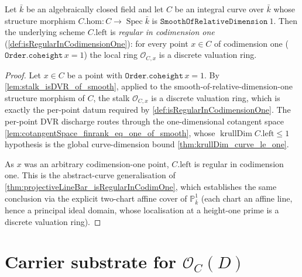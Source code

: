 \begin{theorem}

  \label{thm:smooth_isRegularInCodimOne}
  Let \(\bar k\) be an algebraically closed field and let \(C\) be an
  integral curve over
  \(\bar k\) whose structure morphism
  \(C.\mathrm{hom} : C \to \operatorname{Spec} \bar k\) is
  \(\texttt{SmoothOfRelativeDimension}\ 1\). Then the underlying scheme
  \(C.\mathrm{left}\) is \emph{regular in codimension one}
  (\cref{def:isRegularInCodimensionOne}): for every point \(x \in C\) of
  codimension one (\(\texttt{Order.coheight}\,x = 1\)) the local ring
  \(\mathcal O_{C, x}\) is a discrete valuation ring.
\end{theorem}

\begin{proof}
        \leanok
  Let \(x \in C\) be a point with \(\texttt{Order.coheight}\,x = 1\). By
  \cref{lem:stalk_isDVR_of_smooth}, applied to the
  smooth-of-relative-dimension-one structure morphism of \(C\), the stalk
  \(\mathcal O_{C, x}\) is a discrete valuation ring, which is exactly the
  per-point datum required by \cref{def:isRegularInCodimensionOne}. The
  per-point DVR discharge routes through the one-dimensional cotangent space
  \cref{lem:cotangentSpace_finrank_eq_one_of_smooth}, whose
  \(\operatorname{krullDim} C.\mathrm{left} \le 1\) hypothesis is the global
  curve-dimension bound \cref{thm:krullDim_curve_le_one}.

  As \(x\) was an arbitrary codimension-one point, \(C.\mathrm{left}\) is
  regular in codimension one. This is the abstract-curve generalisation of
  \cref{thm:projectiveLineBar_isRegularInCodimOne}, which establishes the same
  conclusion via the explicit two-chart affine cover of \(\mathbb P^1_{\bar k}\)
  (each chart an affine line, hence a principal ideal domain, whose localisation
  at a height-one prime is a discrete valuation ring).
\end{proof}

\section{Carrier substrate for \(\mathcal O_C(D)\)}

